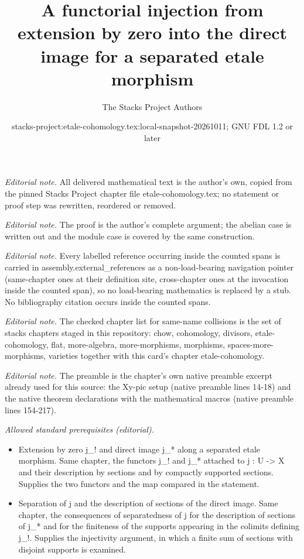 \documentclass[10pt,a4paper]{amsart}
\title{A functorial injection from extension by zero into the direct image for a separated etale morphism}
\author{The Stacks Project Authors}
\date{stacks-project:etale-cohomology.tex:local-snapshot-20261011; GNU FDL 1.2 or later}
\theoremstyle{plain}
\theoremstyle{definition}
\theoremstyle{remark}
\numberwithin{equation}{subsection}
\begin{document}
\maketitle
\noindent\textit{Editorial note.} All delivered mathematical text is the author's own, copied from the pinned Stacks Project chapter file etale-cohomology.tex; no statement or proof step was rewritten, reordered or removed.\par\medskip
\noindent\textit{Editorial note.} The proof is the author's complete argument; the abelian case is written out and the module case is covered by the same construction.\par\medskip
\noindent\textit{Editorial note.} Every labelled reference occurring inside the counted spans is carried in assembly.external\_references as a non-load-bearing navigation pointer (same-chapter ones at their definition site, cross-chapter ones at the invocation inside the counted span), so no load-bearing mathematics is replaced by a stub. No bibliography citation occurs inside the counted spans.\par\medskip
\noindent\textit{Editorial note.} The checked chapter list for same-name collisions is the set of stacks chapters staged in this repository: chow, cohomology, divisors, etale-cohomology, flat, more-algebra, more-morphisms, morphisms, spaces-more-morphisms, varieties together with this card's chapter etale-cohomology.\par\medskip
\noindent\textit{Editorial note.} The preamble is the chapter's own native preamble excerpt already used for this source: the Xy-pic setup (native preamble lines 14-18) and the native theorem declarations with the mathematical macros (native preamble lines 154-217).\par\medskip
\noindent\textit{Allowed standard prerequisites (editorial).}\begin{itemize}
\item Extension by zero j\_! and direct image j\_* along a separated etale morphism. Same chapter, the functors j\_! and j\_* attached to j : U -> X and their description by sections and by compactly supported sections. Supplies the two functors and the map compared in the statement.
\item Separation of j and the description of sections of the direct image. Same chapter, the consequences of separatedness of j for the description of sections of j\_* and for the finiteness of the supports appearing in the colimits defining j\_!. Supplies the injectivity argument, in which a finite sum of sections with disjoint supports is examined.
\end{itemize}\medskip
\end{document}
